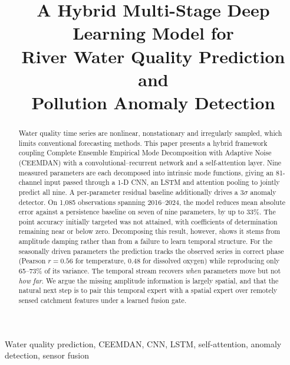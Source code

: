 \documentclass[conference]{IEEEtran}
\begin{document}
\title{A Hybrid Multi-Stage Deep Learning Model for\\
River Water Quality Prediction and\\
Pollution Anomaly Detection}

\author{
}

\maketitle

\begin{abstract}
Water quality time series are nonlinear, nonstationary and irregularly sampled,
which limits conventional forecasting methods. This paper presents a hybrid
framework coupling Complete Ensemble Empirical Mode Decomposition with
Adaptive Noise (CEEMDAN) with a convolutional--recurrent network and a
self-attention layer. Nine measured parameters are each decomposed into
intrinsic mode functions, giving an 81-channel input passed through a 1-D CNN,
an LSTM and attention pooling to jointly predict all nine. A per-parameter
residual baseline additionally drives a $3\sigma$ anomaly detector. On 1{,}085
observations spanning 2016--2024, the model reduces mean absolute error against
a persistence baseline on seven of nine parameters, by up to 33\%. The point
accuracy initially targeted was not attained, with coefficients of
determination remaining near or below zero. Decomposing this result, however,
shows it stems from amplitude damping rather than from a failure to learn
temporal structure. For the
seasonally driven parameters the prediction tracks the observed series in
correct phase (Pearson $r=0.56$ for temperature, $0.48$ for dissolved oxygen)
while reproducing only 65--73\% of its variance. The temporal stream recovers
\emph{when} parameters move but not \emph{how far}. We argue the missing
amplitude information is largely spatial, and that the natural next step is to
pair this temporal expert with a spatial expert over remotely sensed catchment
features under a learned fusion gate.
\end{abstract}

\begin{IEEEkeywords}
Water quality prediction, CEEMDAN, CNN, LSTM, self-attention, anomaly
detection, sensor fusion
\end{IEEEkeywords}
\end{document}
